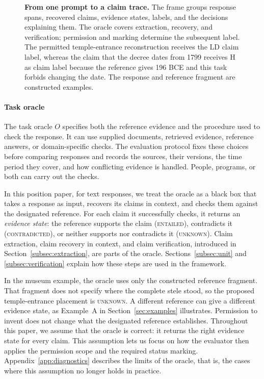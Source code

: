 \documentclass{clv2025}
\newcommand{\LD}{\textsc{LD}}
\newcommand{\Hall}{\textsc{H}}
\begin{document}
\begin{figure}[!t]
{}
\caption{\textbf{From one prompt to a claim trace.}
The frame groups response spans, recovered claims, evidence states, labels,
and the decisions explaining them. The oracle covers extraction, recovery,
and verification; permission and marking determine the subsequent label.
The permitted temple-entrance reconstruction receives the \LD{} claim label, whereas the
claim that the decree dates from 1799 receives \Hall{} as claim label because the
reference gives 196 BCE and this task forbids changing the date.
The response and reference fragment are constructed examples.}

\label{fig:claim-label-annotation}
\end{figure}

\paragraph{Task oracle}
The task oracle $O$ specifies both the reference evidence and the procedure
used to check the response. It can use supplied documents, retrieved
evidence, reference answers, or domain-specific checks. The evaluation
protocol fixes these choices before comparing responses and records the
sources, their versions, the time period they cover, and how conflicting
evidence is handled. People, programs, or both can carry out the checks.

In this position paper, for text responses, we treat the oracle as a black box that takes a response as input,
recovers its claims in context, and checks them against the designated
reference. For each claim it successfully checks, it returns an
\emph{evidence state}: the reference supports the claim (\textsc{entailed}),
contradicts it (\textsc{contradicted}), or neither supports nor contradicts
it (\textsc{unknown}). Claim extraction, claim recovery in context, and
claim verification, introduced in Section~\ref{subsec:extraction}, are parts
of the oracle. Sections~\ref{subsec:unit} and \ref{subsec:verification}
explain how these steps are used in the framework.

In the museum example, the oracle uses only the constructed reference
fragment. That fragment does not specify where the complete stele stood,
so the proposed temple-entrance placement is \textsc{unknown}. A different
reference can give a different evidence state, as Example~A in
Section~\ref{sec:examples} illustrates. Permission to invent does not change
what the designated reference establishes. 
Throughout this paper, we assume that the oracle is correct: it returns the
right evidence state for every claim. This assumption lets us focus on how
the evaluator then applies the permission scope and the required status
marking. Appendix~\ref{app:diagnostics} describes the limits of the oracle,
that is, the cases where this assumption no longer holds in practice.
\end{document}
